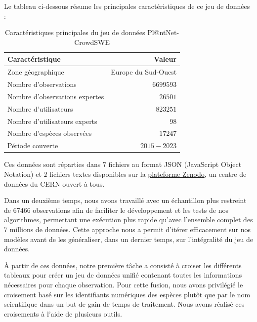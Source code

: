 \documentclass[a4paper,12pt]{article}
\begin{document}
\vspace{0.2cm}

Le tableau ci-dessous résume les principales caractéristiques de ce jeu de données :

\vspace{0.2cm}

\begin{table}[H]
\centering
\begin{tabular}{|l|r|}
    \hline
    Caractéristique & Valeur \\
    \hline
    Zone géographique  & Europe du Sud-Ouest  \\
    Nombre d'observations & $\num{6 699 593}$  \\
    Nombre d'observations expertes & $\num{26 501}$ \\
    Nombre d'utilisateurs  & $\num{823 251}$  \\
    Nombre d'utilisateurs experts  & $98$  \\
    Nombre d'espèces observées  & $\num{17 247}$  \\
    Période couverte  & $2015-2023$  \\
    \hline
    \end{tabular}
\caption{Caractéristiques principales du jeu de données Pl@ntNet-CrowdSWE}
\label{tab:recap des caractéristiques}
\end{table}
    
\vspace{0.2cm}

Ces données sont réparties dans $7$ fichiers au format JSON (JavaScript Object Notation) et $2$ fichiers textes disponibles sur la \href{https://zenodo.org/records/10782465}{plateforme Zenodo}, un centre de données du CERN ouvert à tous.

\vspace{0.2cm}

Dans un deuxième temps, nous avons travaillé avec un échantillon plus restreint de $\num{67 466}$ observations afin de faciliter le développement et les tests de nos algorithmes, permettant une exécution plus rapide qu'avec l'ensemble complet des $7$ millions de données. Cette approche nous a permit d'itérer efficacement sur nos modèles avant de les généraliser, dans un dernier temps, sur l'intégralité du jeu de données.

\vspace{0.2cm}

À partir de ces données, notre première tâche a consisté à croiser les différents tableaux pour créer un jeu de données unifié contenant toutes les informations nécessaires pour chaque observation. Pour cette fusion, nous avons privilégié le croisement basé sur les identifiants numériques des espèces plutôt que par le nom scientifique dans un but de gain de temps de traitement. Nous avons réalisé ces croisements à l'aide de plusieurs outils.
\end{document}
